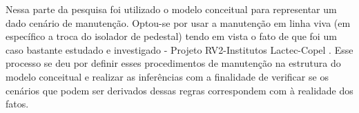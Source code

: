 Nessa parte da pesquisa foi utilizado o modelo conceitual para representar um dado cenário de manutenção. Optou-se por usar a manutenção em linha viva (em específico a troca do isolador de pedestal) tendo em vista o fato de que foi um caso bastante estudado e investigado - Projeto RV2-Institutos Lactec-Copel \cite{wesaac,programa,Gruber2018UsingGE}. Esse processo se deu por definir esses procedimentos de manutenção na estrutura do modelo conceitual e realizar as inferências com a finalidade de verificar se os cenários que podem ser derivados dessas regras correspondem com à realidade dos fatos. 